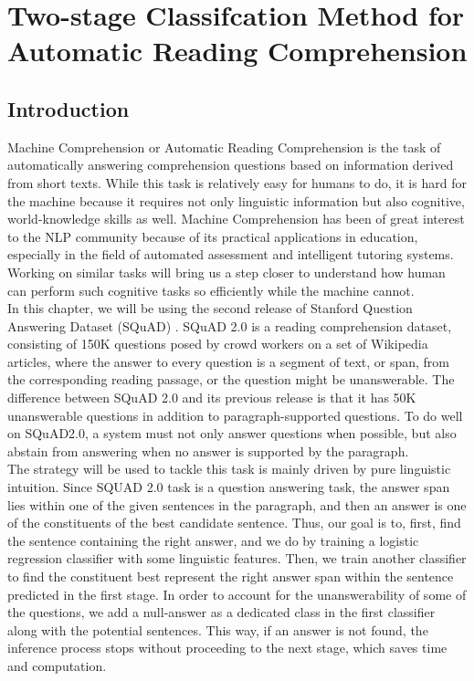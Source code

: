 
\chapter{Two-stage Classifcation Method for Automatic Reading Comprehension } %

\label{Chapter3} %

\section{Introduction}

Machine Comprehension or Automatic Reading Comprehension is the task of automatically answering comprehension questions based on information derived from short texts. While this task is relatively easy for humans to do, it is hard for the machine because it requires not only linguistic information but also cognitive, world-knowledge skills as well. Machine Comprehension has been of great interest to the NLP community because of its practical applications in education, especially in the field of automated assessment and intelligent tutoring systems. Working on similar tasks will bring us a step closer to understand how human can perform such cognitive tasks so efficiently while the machine cannot. \\

In this chapter, we will be using the second release of Stanford Question Answering Dataset (SQuAD) \citep{rajpurkar2018know}. SQuAD 2.0 is a reading comprehension dataset, consisting of 150K questions posed by crowd workers on a set of Wikipedia articles, where the answer to every question is a segment of text, or span, from the corresponding reading passage, or the question might be unanswerable. The difference between SQuAD 2.0 and its previous release is that it has 50K unanswerable questions in addition to paragraph-supported questions.  To do well on SQuAD2.0, a system must not only answer questions when possible, but also abstain from answering when no answer is supported by the paragraph. \\

The strategy will be used to tackle this task is mainly driven by pure linguistic intuition. Since SQUAD 2.0 task is a question answering task, the answer span lies within one of the given sentences in the paragraph, and then an answer is one of the constituents of the best candidate sentence. Thus, our goal is to, first, find the sentence containing the right answer, and we do by training a logistic regression classifier with some linguistic features. Then, we train another classifier to find the constituent best represent the right answer span within the sentence predicted in the first stage. In order to account for the unanswerability of some of the questions, we add a null-answer as a dedicated class in the first classifier along with the potential sentences. This way, if an answer is not found, the inference process stops without proceeding to the next stage, which saves time and computation. 



